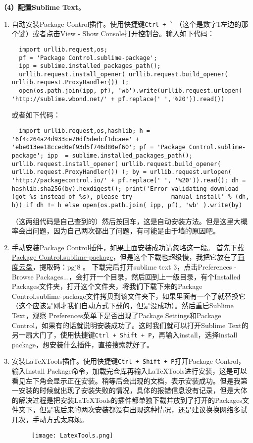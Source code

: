 \documentclass[lang=cn,11pt,a4paper]{elegantpaper}
\begin{document}
\textbf{（4）配置Sublime Text}。
\begin{enumerate}
  \item 自动安装Package Control插件。使用快捷键\lstinline{Ctrl + `} （这个是数字1左边的那个键）或者点击View - Show Console打开控制台。输入如下代码：
  \begin{lstlisting}
  import urllib.request,os; 
  pf = 'Package Control.sublime-package'; 
  ipp = sublime.installed_packages_path(); 
  urllib.request.install_opener( urllib.request.build_opener( urllib.request.ProxyHandler()) ); 
  open(os.path.join(ipp, pf), 'wb').write(urllib.request.urlopen( 'http://sublime.wbond.net/' + pf.replace(' ','%20')).read())
  \end{lstlisting}
  或者如下代码：
  \begin{lstlisting}
  import urllib.request,os,hashlib; h = '6f4c264a24d933ce70df5dedcf1dcaee' + 'ebe013ee18cced0ef93d5f746d80ef60'; pf = 'Package Control.sublime-package'; ipp  = sublime.installed_packages_path(); urllib.request.install_opener( urllib.request.build_opener( urllib.request.ProxyHandler()) ); by = urllib.request.urlopen( 'http://packagecontrol.io/' + pf.replace(' ', '%20')).read(); dh = hashlib.sha256(by).hexdigest(); print('Error validating download (got %s instead of %s), please try           manual install' % (dh, h)) if dh != h else open(os.path.join( ipp, pf), 'wb' ).write(by)
  \end{lstlisting}
  （这两组代码是自己查到的）然后按回车，这是自动安装方法。但是这里大概率会出问题，因为自己两次都出了问题，有可能是由于墙的原因吧。
  \item 手动安装Package Control插件，如果上面安装成功请忽略这一段。
  首先下载 \href{https://sublime.wbond.net/Package}{Package Control.sublime-package}，但是这个下载也超级慢，我把它放在了\href{https://pan.baidu.com/s/1hGTMVhRqANAJREAMJhse_A}{百度云盘}，提取码：pgj8 。
  下载完后打开sublime text 3，点击Preferences - Browse Packages...，会打开一个目录，然后回到上一级目录，有个Installed Packages文件夹，打开这个文件夹，将我们下载下来的Package Control.sublime-package文件拷贝到该文件夹下，如果里面有一个了就替换它（这个应该是刚才我们自动方式下载的，但是没成功）。然后重启Sublime Text，观察 Preferences菜单下是否出现了Package Settings和Package Control，如果有的话就说明安装成功了。这时我们就可以打开Sublime Text的另一扇大门了，使用快捷键\lstinline{Ctrl + Shift + P}，再输入install，选择install package，想安装什么插件，直接搜索就好了。

  \item 安装LaTeXTools插件。使用快捷键\lstinline{Ctrl + Shift + P}打开Package Control，输入Install Package命令，加载完仓库再输入LaTeXTools进行安装，这是可以看见左下角会显示正在安装。稍等后会出现的文档，表示安装成功。但是我第一安装的时候就出现了安装失败的情况，具体的报错信息没有记录，但是大体的解决过程是把安装LaTeXTools的插件都单独下载并放到了打开的Packages文件夹下，但是我后来的两次安装都没有出现这种情况，还是建议换换网络多试几次，手动方式太麻烦。
\begin{figure}[!htb]
\centering
\texttt{[image: LatexTools.png]}
\caption{}
\label{fig.LatexTools}
\end{figure}


\end{enumerate}
\end{document}
